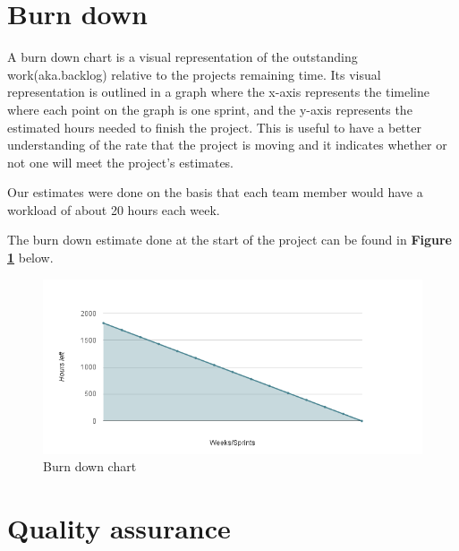 \section{Burn down}

A burn down chart is a visual representation of the outstanding work(aka.backlog) relative to the projects remaining time. Its visual representation is outlined in a graph where the x-axis represents the timeline where each point on the graph is one sprint, and the y-axis represents the estimated hours needed to finish the project. This is useful to have a better understanding of the rate that the project is moving and it indicates whether or not one will meet the project's estimates.\newline

Our estimates were done on the basis that each team member would have a workload of about 20 hours each week. 


The burn down estimate done at the start of the project can be found in \textbf{Figure \ref{Fig:burndownstart}} below. 



\begin{figure}[h!]
	\centering
	\includegraphics[width=\textwidth]{fig/burndownstart}
	\caption{Burn down chart}
	\label{Fig:burndownstart}
\end{figure}


\section{Quality assurance}


